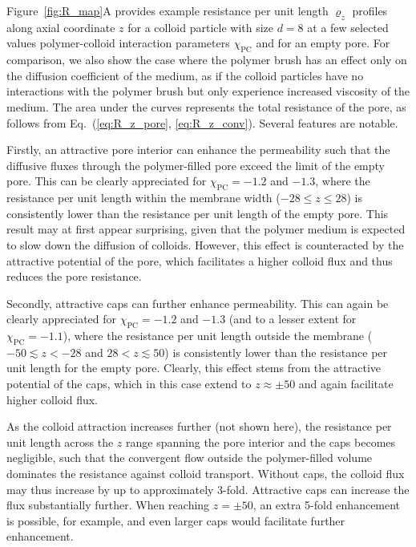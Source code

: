 \documentclass[12pt, a4paper]{article}
\begin{document}
Figure~\ref{fig:R_map}A provides example resistance per unit length $\varrho_{z}$ profiles along axial coordinate $z$ for a colloid particle with size $d=8$ at a few selected values polymer-colloid interaction parameters $\chi_{\text{PC}}$ and for an empty pore.
For comparison, we also show the case where the polymer brush has an effect only on the diffusion coefficient of the medium, as if the colloid particles have no interactions with the polymer brush but only experience increased viscosity of the medium.
The area under the curves represents the total resistance of the pore, as follows from Eq.~(\ref{eq:R_z_pore}, \ref{eq:R_z_conv}).
Several features are notable. 

Firstly, an attractive pore interior can enhance the permeability such that the diffusive fluxes through the polymer-filled pore exceed the limit of the empty pore.
This can be clearly appreciated for $\chi_{\text{PC}} = -1.2$ and $-1.3$, where the resistance per unit length within the membrane width ($-28 \leq z \leq 28$) is consistently lower than the resistance per unit length of the empty pore.
This result may at first appear surprising, given that the polymer medium is expected to slow down the diffusion of colloids.
However, this effect is counteracted by the attractive potential of the pore, which facilitates a higher colloid flux and thus reduces the pore resistance.

Secondly, attractive caps can further enhance permeability.
This can again be clearly appreciated for $\chi_{\text{PC}} = -1.2$ and $-1.3$ (and to a lesser extent for $\chi_{\text{PC}} = -1.1$), where the resistance per unit length outside the membrane ($-50 \lesssim z < -28$ and $28 < z \lesssim 50$) is consistently lower than the resistance per unit length for the empty pore. 
Clearly, this effect stems from the attractive potential of the caps, which in this case extend to $z \approx \pm 50$ and again facilitate higher colloid flux. 

As the colloid attraction increases further (not shown here), the resistance per unit length across the $z$ range spanning the pore interior and the caps becomes negligible, such that the convergent flow outside the polymer-filled volume dominates the resistance against colloid transport.
Without caps, the colloid flux may thus increase by up to approximately 3-fold. 
Attractive caps can increase the flux substantially further.
When reaching $z = \pm 50$, an extra 5-fold enhancement is possible, for example, and even larger caps would facilitate further enhancement.
\end{document}
